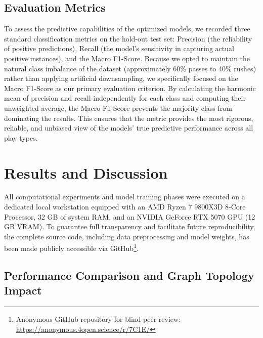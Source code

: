 \documentclass[runningheads]{llncs}
\begin{document}
\subsection{Evaluation Metrics}
\label{subsec:metrics}

To assess the predictive capabilities of the optimized models, we recorded three standard classification metrics on the hold-out test set: Precision (the reliability of positive predictions), Recall (the model's sensitivity in capturing actual positive instances), and the Macro F1-Score. Because we opted to maintain the natural class imbalance of the dataset (approximately 60\% passes to 40\% rushes) rather than applying artificial downsampling, we specifically focused on the Macro F1-Score as our primary evaluation criterion. By calculating the harmonic mean of precision and recall independently for each class and computing their unweighted average, the Macro F1-Score prevents the majority class from dominating the results. This ensures that the metric provides the most rigorous, reliable, and unbiased view of the models' true predictive performance across all play types.

\section{Results and Discussion}
\label{sec:results}

All computational experiments and model training phases were executed on a dedicated local workstation equipped with an AMD Ryzen 7 9800X3D 8-Core Processor, 32 GB of system RAM, and an NVIDIA GeForce RTX 5070 GPU (12 GB VRAM). To guarantee full transparency and facilitate future reproducibility, the complete source code, including data preprocessing and model weights, has been made publicly accessible via GitHub\footnote{Anonymous GitHub repository for blind peer review: \url{https://anonymous.4open.science/r/7C1E/}}.

\subsection{Performance Comparison and Graph Topology Impact}

\end{document}
